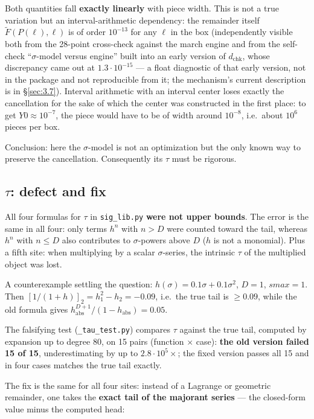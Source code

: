 Both quantities fall \textbf{exactly linearly} with piece width. This is not a
true variation but an interval-arithmetic dependency: the remainder itself
$\widetilde{F}(P(\ell),\ell)$ is of order $10^{-13}$ for any $\ell$ in the box (independently visible
both from the 28-point cross-check against the march engine and from the
self-check ``$\sigma$-model versus engine'' built into an early version of $d_{\mathrm{chk}}$,
whose discrepancy came out at $1.3 \cdot 10^{-15}$ --- a float diagnostic of
that early version, not in the package and not reproducible from it; the
mechanism's current description is in \S\ref{sec:3.7}).
Interval arithmetic with an interval center loses exactly the cancellation
for the sake of which the center was constructed in the first place: to get
$Y0 \approx 10^{-7}$, the piece would have to be of width around $10^{-8}$, i.e.\ about $10^{6}$
pieces per box.

Conclusion: here the $\sigma$-model is not an optimization but the only known way
to preserve the cancellation. Consequently its $\tau$ must be rigorous.


\subsection{$\tau$: defect and fix}
\label{sec:3.5}

All four formulas for $\tau$ in \texttt{sig\_lib.py} \textbf{were not upper bounds}. The
error is the same in all four: only terms $h^n$ with $n > D$ were counted
toward the tail, whereas $h^n$ with $n \le D$ also contributes to $\sigma$-powers above
$D$ ($h$ is not a monomial). Plus a fifth site: when multiplying by a scalar
$\sigma$-series, the intrinsic $\tau$ of the multiplied object was lost.

A counterexample settling the question: $h(\sigma) = 0.1\sigma + 0.1\sigma^2$, $D = 1$,
$\mathit{smax} = 1$. Then $[1/(1+h)]_2 = h_1^2 - h_2 = -0.09$, i.e.\ the true tail is
$\ge 0.09$, while the old formula gives $h_{\mathrm{abs}}^{D+1}/(1-h_{\mathrm{abs}}) = 0.05$.

The falsifying test (\texttt{\_\allowbreak tau\_\allowbreak test.py}) compares $\tau$ against the true tail,
computed by expansion up to degree 80, on 15 pairs (function $\times$ case): \textbf{the
old version failed 15 of 15}, underestimating by up to $2.8 \cdot 10^5 \times$; the fixed
version passes all 15 and in four cases matches the true tail exactly.

The fix is the same for all four sites: instead of a Lagrange or geometric
remainder, one takes the \textbf{exact tail of the majorant series} --- the
closed-form value minus the computed head:

